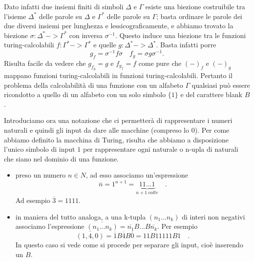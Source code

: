 Dato infatti due insiemi finiti di simboli $\Delta$ e $\Gamma$ 
esiste una biezione costruibile tra l'isieme $\Delta^*$ delle 
parole su $\Delta$  e $\Gamma^*$ delle parole su $\Gamma$; 
basta ordinare le parole dei due diversi insiemi per lunghezza 
e lessicograficamente, e abbiamo trovato la biezione
$\sigma: \Delta^*->\Gamma^*$ con inversa $\sigma^{-1}$. Questo
induce una biezione tra le funzioni turing-calcolabili 
$f:\Gamma^*->\Gamma^*$ e quelle $g:\Delta^*->\Delta^*$. 
Basta infatti porre 
$$g_f = \sigma^{-1} f \sigma \quad f_g=\sigma g \sigma^{-1}.$$ 
Risulta facile da vedere che $g_{f_g}=g$ e $f_{g_f}=f$ come pure 
che $(-)_f$ e $(-)_g$ mappano funzioni turing-calcolabili in funzioni 
turing-calcolabili. Pertanto il problema della calcolabilit\`a di 
una funzione con un alfabeto $\Gamma$ qualsiasi pu\`o essere 
ricondotto a quello di un alfabeto con un solo simbolo $\{1\}$ e del carattere blank $B$.


Introduciamo ora una notazione che ci permetter\`a di rappresentare i
numeri naturali e quindi gli input da dare alle macchine (compreso lo
0). Per come abbiamo definito la macchina di Turing, risulta che
abbiamo a disposizione l'unico simbolo di input $1$ per rappresentare
ogni naturale o n-upla di naturali che siano nel dominio di una
funzione.

\begin{itemize}
\item preso un numero $n\in {N}$, ad esso associamo un'espressione
$$\overline{n}=1^{n+1}=\underbrace{11...1}_{n+1\ volte}\quad\mbox{.}$$
  Ad esempio $\overline{3}=1111$.
\item in maniera del tutto analoga, a una k-tupla $(n_{1}...n_{k})$ di
  interi non negativi associamo l'espressione
  $\overline{(n_{1}...n_{k})}=\overline{n_{1}}B...B\overline{n_{k}}$. Per
  esempio $$\overline{(1,4,0)}=\overline{1}B\overline{4}B\overline{0}=
11B11111B1\quad\mbox {.}$$ In questo caso si vede come si procede
  per separare gli input, cio\`e inserendo un $B$.
\end{itemize}

